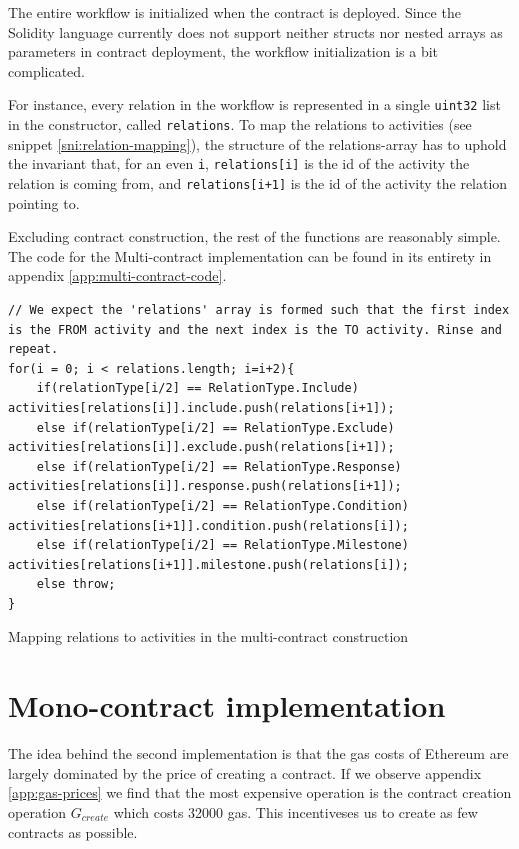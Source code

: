 \documentclass{article}
\begin{document}
		The entire workflow is initialized when the contract is deployed.
		Since the Solidity language currently does not support neither structs nor nested arrays as parameters in contract deployment, the workflow initialization is a bit complicated. 

		For instance, every relation in the workflow is represented in a single \texttt{uint32} list in the constructor, called \texttt{relations}. 
		To map the relations to activities (see snippet \ref{sni:relation-mapping}), the structure of the relations-array has to uphold the invariant that, for an even \texttt{i}, \texttt{relations[i]} is the id of the activity the relation is coming from, and \texttt{relations[i+1]} is the id of the activity the relation pointing to.

		Excluding contract construction, the rest of the functions are reasonably simple.
		The code for the Multi-contract implementation can be found in its entirety in appendix \ref{app:multi-contract-code}.

		\begin{snippet}[!ht]
			\centering
			\begin{lstlisting}[language=solidity, numbers=none]
// We expect the 'relations' array is formed such that the first index is the FROM activity and the next index is the TO activity. Rinse and repeat.
for(i = 0; i < relations.length; i=i+2){
    if(relationType[i/2] == RelationType.Include)        	activities[relations[i]].include.push(relations[i+1]);
    else if(relationType[i/2] == RelationType.Exclude)   	activities[relations[i]].exclude.push(relations[i+1]);
    else if(relationType[i/2] == RelationType.Response)  	activities[relations[i]].response.push(relations[i+1]);
    else if(relationType[i/2] == RelationType.Condition) 	activities[relations[i+1]].condition.push(relations[i]);
    else if(relationType[i/2] == RelationType.Milestone) 	activities[relations[i+1]].milestone.push(relations[i]);
    else throw;
}			
			\end{lstlisting}
		 	\caption[Mapping relations to activities in the multi-contract construction]
		 	{Mapping relations to activities in the multi-contract construction}
		 	\label{sni:relation-mapping}
		\end{snippet}

	\section{Mono-contract implementation}
	The idea behind the second implementation is that the gas costs of Ethereum are largely dominated by the price of creating a contract. If we observe appendix \ref{app:gas-prices} we find that the most expensive operation is the contract creation operation $G_{create}$ which costs 32000 gas. 
	This incentiveses us to create as few contracts as possible. 
\end{document}

